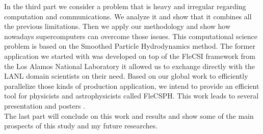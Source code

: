 In the third part we consider a problem that is heavy and irregular regarding computation and communications.
We analyze it and show that it combines all the previous limitations. 
Then we apply our methodology and show how nowadays supercomputers can overcome those issues. 
This computational science problem is based on the Smoothed Particle Hydrodynamics method.
The former application we started with was developed on top of the FleCSI framework from the Los Alamos National Laboratory it allowed us to exchange directly with the LANL domain scientists on their need.
Based on our global work to efficiently parallelize those kinds of production application, we intend to provide an efficient tool for physicists and astrophysicists called FleCSPH. 
This work leads to several presentation and posters \cite{debrye20162HOT,loiseau2017SC}.\\

The last part will conclude on this work and results and show some of the main prospects of this study and my future researches. 